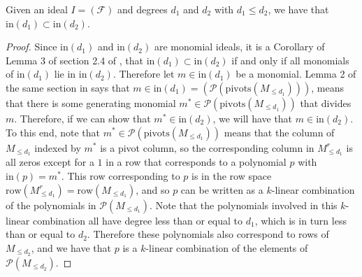 \documentclass[12pt]{article}
\newenvironment{lemma}[2][Lemma]{\begin{trivlist}
\item[\hskip \labelsep {\bfseries #1}\hskip \labelsep {\bfseries #2.}]}{\end{trivlist}}
\newcommand{\init}{\text{in}}
\newcommand{\Poly}{\mathscr{P}}
\newcommand{\row}{\text{row}}
\newcommand{\piv}{\text{pivots}}
\newcommand{\F}{\mathcal{F}}
\begin{document}
\newpage

\begin{lemma}{2}
	Given an ideal $I = (\F)$ and degrees $d_1$ and $d_2$ with $d_1 \leq d_2$, we have that $\init(d_1) \subset \init(d_2)$. 
\end{lemma}

\begin{proof}
	Since $\init(d_1)$ and $\init(d_2)$ are monomial ideals, it is a Corollary of Lemma 3 of section 2.4 of \cite{cox2013ideals}, that $\init(d_1) \subset \init(d_2)$ if and only if all monomials of $\init(d_1)$ lie in $\init(d_2)$. Therefore let $m \in \init(d_1)$ be a monomial. Lemma 2 of the same section in \cite{cox2013ideals} says that $m \in \init(d_1) = (\Poly(\piv(M_{\leq d_1})))$, means that there is some generating monomial $m^* \in \Poly(\piv(M_{\leq d_1}))$ that divides $m$. Therefore, if we can show that $m^* \in \init(d_2)$, we will have that $m \in \init(d_2)$. To this end, note that $m^* \in \Poly(\piv(M_{\leq d_1}))$ means that the column of $M_{\leq d_1}$ indexed by $m^*$ is a pivot column, so the corresponding column in $M_{\leq d_1}^r$ is all zeros except for a $1$ in a row that corresponds to a polynomial $p$ with $\init(p) = m^*$. This row corresponding to $p$ is in the row space $\row(M_{\leq d_1}^r) = \row(M_{\leq d_1})$, and so $p$ can be written as a $k$-linear combination of the polynomials in $\Poly(M_{\leq d_1})$. Note that the polynomials involved in this $k$-linear combination all have degree less than or equal to $d_1$, which is in turn less than or equal to $d_2$. Therefore these polynomials also correspond to rows of $M_{\leq d_2}$, and we have that $p$ is a $k$-linear combination of the elements of $\Poly(M_{\leq d_2})$. 


\end{proof}
\end{document}
